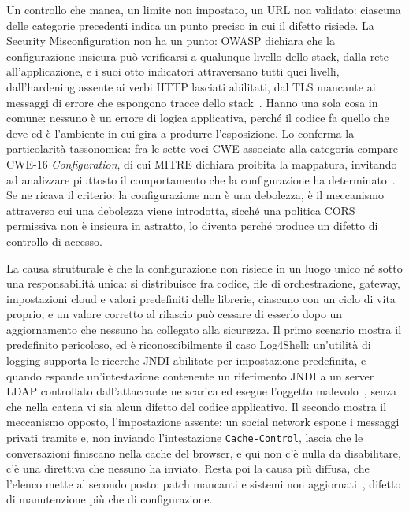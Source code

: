 Un controllo che manca, un limite non impostato, un URL non validato: ciascuna
delle categorie precedenti indica un punto preciso in cui il difetto risiede.
La Security Misconfiguration non ha un punto: OWASP dichiara che la configurazione insicura può
verificarsi a qualunque livello dello stack, dalla rete all'applicazione, e i suoi otto
indicatori attraversano tutti quei livelli, dall'hardening assente ai verbi
HTTP lasciati abilitati, dal TLS mancante ai messaggi di errore che espongono
tracce dello stack~\cite{owasp2023api8}. Hanno una sola cosa in comune: nessuno
è un errore di logica applicativa, perché il codice fa quello che deve ed è
l'ambiente in cui gira a produrre l'esposizione. Lo conferma la particolarità
tassonomica: fra le sette voci CWE associate alla categoria compare CWE-16
\emph{Configuration}, di cui MITRE dichiara proibita la mappatura, invitando ad
analizzare piuttosto il comportamento che la configurazione ha
determinato~\cite{cwe16}. Se ne ricava il criterio: la
configurazione non è una debolezza, è il meccanismo attraverso cui una
debolezza viene introdotta, sicché una politica CORS permissiva non è insicura
in astratto, lo diventa perché produce un difetto di controllo di accesso.

La causa strutturale è che la configurazione non risiede in un luogo unico né
sotto una responsabilità unica: si distribuisce fra codice, file di
orchestrazione, gateway, impostazioni cloud e valori predefiniti delle
librerie, ciascuno con un ciclo di vita proprio, e un valore corretto al
rilascio può cessare di esserlo dopo un aggiornamento che nessuno ha collegato
alla sicurezza. Il primo scenario mostra il predefinito pericoloso, ed è
riconoscibilmente il caso Log4Shell: un'utilità di logging supporta le ricerche
JNDI abilitate per impostazione predefinita, e quando espande un'intestazione
contenente un riferimento JNDI a un server LDAP controllato dall'attaccante ne
scarica ed esegue l'oggetto malevolo~\cite{owasp2023api8}, senza che nella
catena vi sia alcun difetto del codice applicativo. Il secondo mostra il
meccanismo opposto, l'impostazione assente: un social network espone i messaggi
privati tramite  e, non inviando l'intestazione
\texttt{Cache-Control}, lascia che le conversazioni finiscano nella cache del
browser, e qui non c'è nulla da disabilitare, c'è una direttiva che nessuno ha
inviato. Resta poi la causa più diffusa, che l'elenco mette al secondo posto:
patch mancanti e sistemi non aggiornati~\cite{owasp2023api8}, difetto di
manutenzione più che di configurazione.

